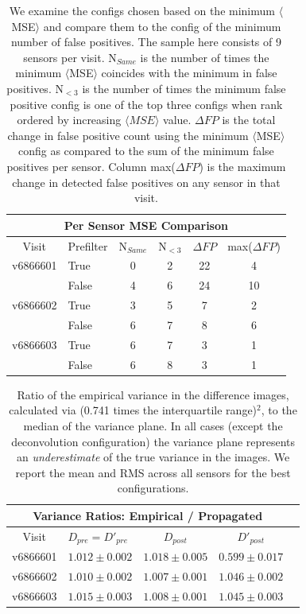 \documentclass[prd, nofootinbib, floatfix, 11pt,tightenlines,times]{article}
\begin{document}
\begin{table}
\centering
\begin{tabular}{clcccc}
\hline
\multicolumn{6}{|c|}{Per Sensor MSE Comparison} \\
\hline
Visit    & Prefilter & N$_{Same}$ & N$_{<3}$ & $\Delta FP$ & max($\Delta FP$)\\
\hline
v6866601 & True      & 0      & 2        & 22 & 4\\
         & False     & 4      & 6        & 24 & 10\\
v6866602 & True      & 3      & 5        & 7 & 2\\
         & False     & 6      & 7        & 8 & 6\\
v6866603 & True      & 6      & 7        & 3 & 1\\
         & False     & 6      & 8        & 3 & 1\\
\end{tabular}
\caption{
We examine the configs chosen based on the minimum $\langle $MSE$\rangle$ and compare them to the config of the
minimum number of false positives.  The sample here consists of 9 sensors per visit.  
N$_{Same}$ is the number of times the minimum $\langle $MSE$\rangle$ coincides with the minimum in false positives.  N$_{<3}$
is the number of times the minimum false positive config is one of the top three configs when rank ordered by increasing
$\langle MSE \rangle$ value.  $\Delta FP$
is the total change in false positive count using the minimum $\langle $MSE$\rangle$ config as compared to the sum of the minimum 
false positives per sensor.  Column max($\Delta FP$) is the maximum change in detected false positives on any sensor in that visit.
\label{tab-MSE_persensor}}
\end{table}

\clearpage

\begin{table}
\centering
\begin{tabular}{clccc}
\hline
\multicolumn{4}{|c|}{Variance Ratios: Empirical / Propagated} \\
\hline
Visit    & $D_{pre} = D'_{pre}$ & $D_{post}$ & $D'_{post}$ \\
\hline
v6866601 &$1.012 \pm 0.002$&$1.018 \pm 0.005$&$0.599 \pm 0.017$ \\
v6866602 &$1.010 \pm 0.002$&$1.007 \pm 0.001$&$1.046 \pm 0.002$ \\
v6866603 &$1.015 \pm 0.003$&$1.008 \pm 0.001$&$1.045 \pm 0.003$ \\
\end{tabular}
\caption{Ratio of the empirical variance in the difference images,
  calculated via (0.741 times the interquartile range)$^2$, to the
  median of the variance plane.  In all cases (except the deconvolution configuration) the variance plane
  represents an {\it underestimate} of the true variance in the
  images.  We report the mean and RMS across all sensors for the best
  configurations.  }
\label{tab-variance1}
\end{table}
\end{document}
